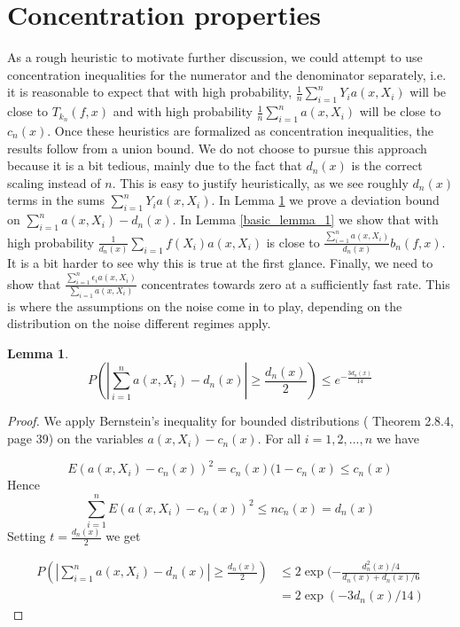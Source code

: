 \documentclass{article}
\newtheorem{lemma}[theorem]{Lemma}
\begin{document}
\section{Concentration properties}
\label{concentration_properties}
As a rough heuristic to motivate further discussion, we could attempt to use concentration inequalities for the numerator and the denominator separately, i.e. it is reasonable to expect that with high probability, $\frac{1}{n}\sum_{i=1}^n Y_ia(x,X_i)$ will be close to $T_{k_n}(f,x)$ and with high probability $\frac{1}{n}\sum_{i=1}^na(x,X_i)$ will be close to $c_n(x)$. Once these heuristics are formalized as concentration inequalities, the results follow from a union bound. We do not choose to pursue this approach because it is a bit tedious, mainly due to the fact that $d_n(x)$ is the correct scaling instead of $n$. This is easy to justify heuristically, as we see roughly $d_n(x)$ terms in the sums $\sum_{i=1}^n Y_ia(x,X_i)$. In Lemma \ref{bernstein_corollary} we prove a deviation bound on $\sum_{i=1}^n a(x,X_i)-d_n(x)$. In Lemma \ref{basic_lemma_1} we show that with high probability  $\frac{1}{d_n(x)}\sum_{i=1}f(X_i)a(x,X_i)$ is close to $\frac{\sum_{i=1}^na(x,X_i)}{d_n(x)}b_n(f,x)$. It is a bit harder to see why this is true at the first glance. Finally, we need to show that  $\frac{\sum_{i=1}^n\epsilon_ia(x,X_i)}{\sum_{i=1}a(x,X_i)}$ concentrates towards zero at a sufficiently fast rate. This is where the assumptions on the noise come in to play, depending on the distribution on the noise different regimes apply. 

\begin{lemma}
\label{bernstein_corollary}
\begin{equation*}
    P(|\sum_{i=1}^na(x,X_i)-d_n(x)|\geq \frac{d_n(x)}{2})\leq e^{-\frac{3d_n(x)}{14}} 
\end{equation*}
\end{lemma}

\begin{proof}
We apply Bernstein's inequality for bounded distributions (\cite{vershynin} Theorem 2.8.4, page 39) on the variables $a(x,X_i)-c_n(x)$. For all $i=1,2,...,n$ we have

\begin{equation*}
    E(a(x,X_i)-c_n(x))^2=c_n(x)(1-c_n(x)\leq c_n(x)
\end{equation*}
Hence
\begin{equation*}
    \sum_{i=1}^n E(a(x,X_i)-c_n(x))^2\leq nc_n(x)=d_n(x)
\end{equation*}
Setting $t=\frac{d_n(x)}{2}$ we get

\begin{equation*}
\begin{split}
    P(|\sum_{i=1}^n a(x,X_i)-d_n(x)|\geq \frac{d_n(x)}{2})&\leq 2\exp(-\frac{d^2_n(x)/4}{d_n(x)+d_n(x)/6}\\
    &=2\exp(-3d_n(x)/14)
\end{split}
\end{equation*}
\end{proof}
\end{document}
